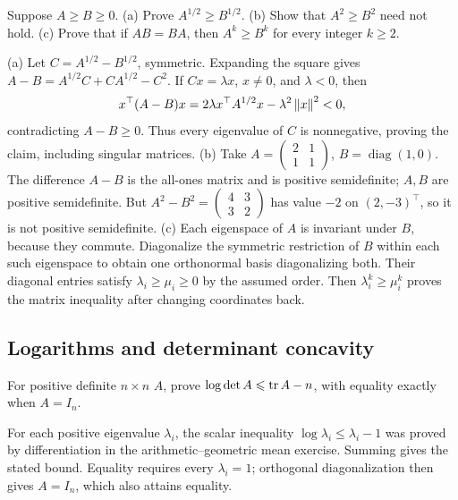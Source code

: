 \begin{problem}\label{ex:12:ineq-ma-19}
Suppose \(A\geqslant B\geqslant0\).
(a) Prove \(A^{1/2}\geqslant B^{1/2}\).
(b) Show that \(A^2\geqslant B^2\) need not hold.
(c) Prove that if \(AB=BA\), then \(A^k\geqslant B^k\) for every integer
\(k\geqslant2\).
\end{problem}
\begin{solution}
(a) Let \(C=A^{1/2}-B^{1/2}\), symmetric. Expanding the square gives
\(A-B=A^{1/2}C+CA^{1/2}-C^2\).
If \(Cx=\lambda x\), \(x\ne0\), and \(\lambda<0\), then
\[
x^\top(A-B)x=2\lambda x^\top A^{1/2}x-\lambda^2\left\lVert x\right\rVert^2<0,
\]
contradicting \(A-B\geqslant0\). Thus every eigenvalue of \(C\) is
nonnegative, proving the claim, including singular matrices.
(b) Take \(A=\begin{pmatrix}2&1\\1&1\end{pmatrix}\),
\(B=\operatorname{diag}(1,0)\). The difference \(A-B\) is the all-ones
matrix and is positive semidefinite; \(A,B\) are positive semidefinite.
But \(A^2-B^2=\begin{pmatrix}4&3\\3&2\end{pmatrix}\) has value \(-2\)
on \((2,-3)^\top\), so it is not positive semidefinite.
(c) Each eigenspace of \(A\) is invariant under \(B\), because they
commute. Diagonalize the symmetric restriction of \(B\) within each
such eigenspace to obtain one orthonormal basis diagonalizing both.
Their diagonal entries satisfy \(\lambda_i\geqslant\mu_i\geqslant0\)
by the assumed order. Then \(\lambda_i^k\geqslant\mu_i^k\) proves the
matrix inequality after changing coordinates back.
\end{solution}

\subsection*{Logarithms and determinant concavity}

\begin{problem}\label{ex:12:ineq-ma-20}
For positive definite \(n\times n\) \(A\), prove
\(\log\det A\leqslant\operatorname{tr} A-n\), with equality exactly when \(A=I_n\).
\end{problem}
\begin{solution}
For each positive eigenvalue \(\lambda_i\), the scalar inequality
\(\log\lambda_i\leqslant\lambda_i-1\) was proved by differentiation
in the arithmetic–geometric mean exercise. Summing gives the stated bound.
Equality requires every \(\lambda_i=1\); orthogonal diagonalization
then gives \(A=I_n\), which also attains equality.
\end{solution}

